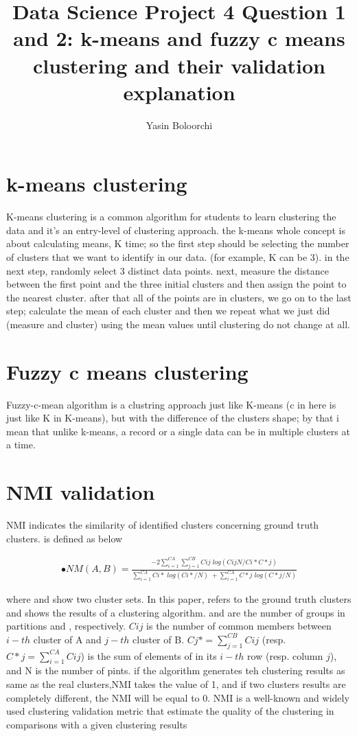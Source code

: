 \documentclass[a4paper]{article}
\begin{document}
\title{Data Science Project 4 Question 1 and 2: k-means and fuzzy c means clustering and their validation explanation}
\author{Yasin Boloorchi}

\maketitle

\section{k-means clustering}
	K-means clustering is a common algorithm for students to learn clustering the data and it's an entry-level of clustering approach. the k-means whole concept is about calculating means, K time; so the first step should be selecting the number of clusters that we want to identify in our data. (for example, K can be 3). in the next step, randomly select 3 distinct data points. next, measure the distance between the first point and the three initial clusters and then assign the point to the nearest cluster. 
	after that all of the points are in clusters, we go on to the last step; calculate the mean of each cluster and then we repeat what we just did (measure and cluster) using the mean values until clustering do not change at all.
	
	
\section{Fuzzy c means clustering}
	Fuzzy-c-mean algorithm is a clustring approach just like K-means (c in here is just like K in K-means), but with the difference of the clusters shape; by that i mean that unlike k-means, a record or a single data can be in multiple clusters at a time.


\section{NMI validation}
	NMI indicates the similarity of identified clusters concerning
ground truth clusters. is defined as below 

	\begin{eqnarray}
	• NM(A,B) = \frac{-2 \sum_{i=1}^{CA} \sum_{j=1}^{CB} Cij\; log(CijN/Ci*C*j)}
	{\sum_{i=1}^{CA} Ci*\; log(Ci*/N)\; + \sum_{i=1}^{CA} C*j\; log(C*j/N)}
	\end{eqnarray}

where and show two cluster sets. In this paper, refers to the ground truth clusters and shows the
results of a clustering algorithm. and are the number of groups in partitions and , respectively.
$Cij$ is the number of common members between $i-th$ cluster of A and $j-th$ cluster of B. $Cj* = \sum_{j=1}^{CB} Cij$ (resp. $C*j = \sum_{i=1}^{CA} Cij$) is the sum of elements of in its $i-th$ row (resp. column $j$), and N is the number of pints. if the algorithm generates teh clustering results as same as the real clusters,NMI takes the value of
1, and if two clusters results are completely different, the NMI will be equal to 0. NMI is a well-known
and widely used clustering validation metric that estimate the quality of the clustering in comparisons with
a given clustering results
	
\end{document}
